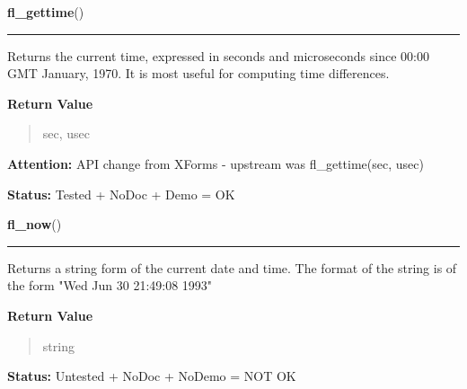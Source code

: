 \hspace{.8\funcindent}\begin{boxedminipage}{\funcwidth}

    \raggedright \textbf{fl\_gettime}()

    \vspace{-1.5ex}

    \rule{\textwidth}{0.5\fboxrule}
\setlength{\parskip}{2ex}
    Returns the current time, expressed in seconds and microseconds since 
    00:00 GMT January, 1970. It is most useful for computing time 
    differences.

\setlength{\parskip}{1ex}
      \textbf{Return Value}
    \vspace{-1ex}

      \begin{quote}
      sec, usec

      \end{quote}

\textbf{Attention:} API change from XForms - upstream was fl\_gettime(sec, usec)



\textbf{Status:} Tested + NoDoc + Demo = OK



    \end{boxedminipage}

    \label{xformslib:library:fl_now}

    \vspace{0.5ex}

\hspace{.8\funcindent}\begin{boxedminipage}{\funcwidth}

    \raggedright \textbf{fl\_now}()

    \vspace{-1.5ex}

    \rule{\textwidth}{0.5\fboxrule}
\setlength{\parskip}{2ex}
    Returns a string form of the current date and time. The format of the 
    string is of the form "Wed Jun 30 21:49:08 1993"

\setlength{\parskip}{1ex}
      \textbf{Return Value}
    \vspace{-1ex}

      \begin{quote}
      string

      \end{quote}

\textbf{Status:} Untested + NoDoc + NoDemo = NOT OK



    \end{boxedminipage}

